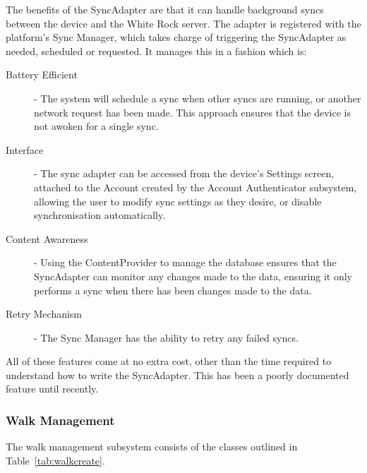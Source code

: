 \documentclass[11pt,a4paper]{report}
\begin{document}
The benefits of the SyncAdapter are that it can handle background syncs between the device and the White Rock server. The adapter is registered with the platform's Sync Manager, which takes charge of triggering the SyncAdapter as needed, scheduled or requested. It manages this in a fashion which is:
\begin{description}
\item[Battery Efficient] - The system will schedule a sync when other syncs are running, or another network request has been made. This approach ensures that the device is not awoken for a single sync.
\item[Interface] - The sync adapter can be accessed from the device's Settings screen, attached to the Account created by the Account Authenticator subsystem, allowing the user to modify sync settings as they desire, or disable synchronisation automatically.
\item[Content Awareness] - Using the ContentProvider to manage the database ensures that the SyncAdapter can monitor any changes made to the data, ensuring it only performs a sync when there has been changes made to the data.
\item[Retry Mechanism] - The Sync Manager has the ability to retry any failed syncs.
\end{description}
All of these features come at no extra cost, other than the time required to understand how to write the SyncAdapter. This has been a poorly documented feature until recently.

\subsubsection{Walk Management}
\label{sec:walkcreate}

The walk management subsystem consists of the classes outlined in Table~\ref{tab:walkcreate}.
\end{document}
